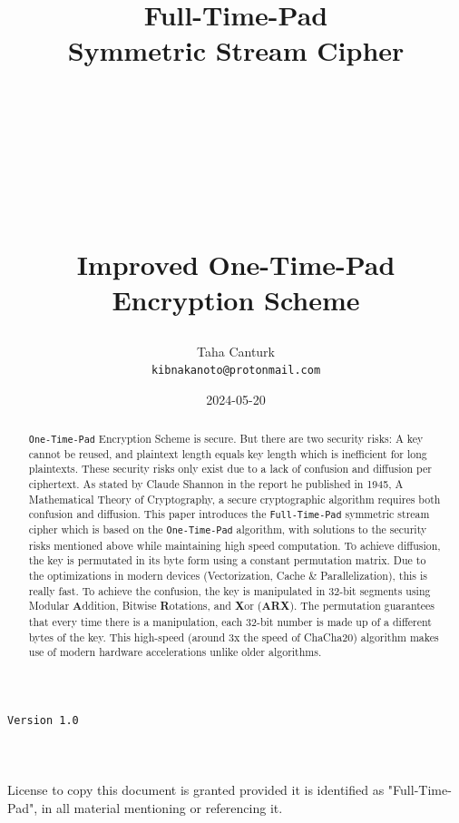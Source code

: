 \documentclass[fleqn, a4paper,12pt]{article}
\title {
	\Huge \textbf{Full-Time-Pad\\Symmetric Stream Cipher} \\
	\ \\
	\ \\
	\ \\
	\ \\
	\ \\
	\Large \textbf{Improved One-Time-Pad Encryption Scheme}

}
\author{Taha Canturk\\\texttt{kibnakanoto@protonmail.com}}
\date{2024-05-20}
\begin{document}
\maketitle
\thispagestyle{empty}


\begin{center}
		\Large \texttt{Version 1.0}
		\ \\
		\ \\
		\ \\
		\ \\
		\small License to copy this document is granted provided it is identified as "Full-Time-Pad", in all material mentioning or referencing it.
\end{center}

\newpage


\begin{abstract}
		\fontsize{12}{18}\selectfont \texttt{One-Time-Pad} Encryption Scheme is secure. But there are two security risks: A key cannot be reused, and plaintext length equals key length which is inefficient for long plaintexts. These security risks only exist due to a lack of confusion and diffusion per ciphertext. As stated by Claude Shannon in the report he published in 1945, A Mathematical Theory of Cryptography, a secure cryptographic algorithm requires both confusion and diffusion. This paper introduces the \texttt{Full-Time-Pad} symmetric stream cipher which is based on the \texttt{One-Time-Pad} algorithm, with solutions to the security risks mentioned above while maintaining high speed computation.
		To achieve diffusion, the key is permutated in its byte form using a constant permutation matrix. Due to the optimizations in modern devices (Vectorization, Cache \& Parallelization), this is really fast. To achieve the confusion, the key is manipulated in 32-bit segments using Modular \textbf{A}ddition, Bitwise \textbf{R}otations, and \textbf{X}or (\textbf{ARX}). The permutation guarantees that every time there is a manipulation, each 32-bit number is made up of a different bytes of the key. This high-speed (around 3x the speed of ChaCha20) algorithm makes use of modern hardware accelerations unlike older algorithms.

\end{abstract}

\newpage

\tableofcontents

\newpage

\end{document}
